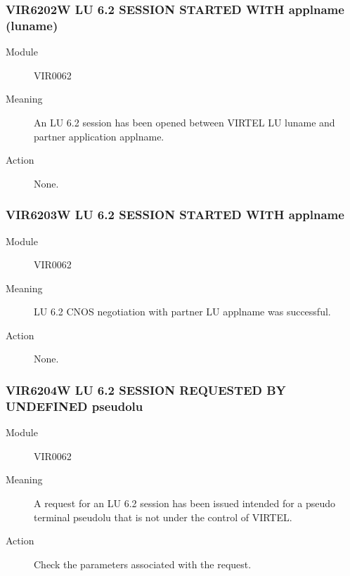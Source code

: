 \documentclass[letterpaper,10pt,english]{sphinxmanual}
\begin{document}
\subsubsection{VIR6202W LU 6.2 SESSION STARTED WITH applname (luname)}
\label{\detokenize{messages:vir6202w-lu-6-2-session-started-with-applname-luname}}\begin{description}
\item[{Module}] \leavevmode
VIR0062

\item[{Meaning}] \leavevmode
An LU 6.2 session has been opened between VIRTEL LU luname and partner application applname.

\item[{Action}] \leavevmode
None.

\end{description}


\subsubsection{VIR6203W LU 6.2 SESSION STARTED WITH applname}
\label{\detokenize{messages:vir6203w-lu-6-2-session-started-with-applname}}\begin{description}
\item[{Module}] \leavevmode
VIR0062

\item[{Meaning}] \leavevmode
LU 6.2 CNOS negotiation with partner LU applname was successful.

\item[{Action}] \leavevmode
None.

\end{description}


\subsubsection{VIR6204W LU 6.2 SESSION REQUESTED BY UNDEFINED pseudolu}
\label{\detokenize{messages:vir6204w-lu-6-2-session-requested-by-undefined-pseudolu}}\begin{description}
\item[{Module}] \leavevmode
VIR0062

\item[{Meaning}] \leavevmode
A request for an LU 6.2 session has been issued intended for a pseudo terminal pseudolu that is not under the control of VIRTEL.

\item[{Action}] \leavevmode
Check the parameters associated with the request.

\end{description}
\end{document}
